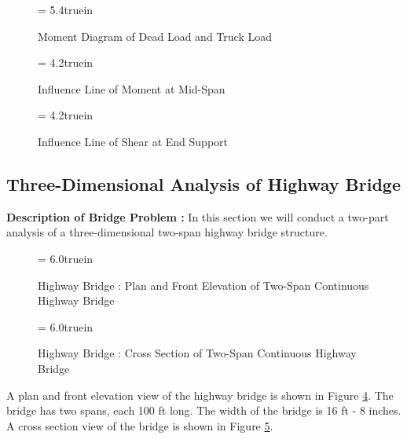 \begin{figure}[h]
\epsfxsize= 5.4truein
\centerline{}
\caption{Moment Diagram of Dead Load and Truck Load}
\label{fig: mom_diag}
\end{figure}

\clearpage
\begin{figure}[th]
\vspace{0.10 in}
\epsfxsize= 4.2truein
\centerline{}
\caption{Influence Line of Moment at Mid-Span}
\label{fig: influ_m}
\end{figure}

\begin{figure}[h]
\vspace{0.30 in}
\epsfxsize= 4.2truein
\centerline{}
\caption{Influence Line of Shear at End Support}
\label{fig: influ_s}
\end{figure}

\clearpage
\subsection{Three-Dimensional Analysis of Highway Bridge}

\vspace{0.15 in}\noindent
{\bf Description of Bridge Problem :}
In this section we will conduct a two-part analysis of a three-dimensional
two-span highway bridge structure.

\begin{figure}[ht]
\epsfxsize= 6.0truein
\centerline{}
\vspace{0.20 in}
\caption{Highway Bridge : Plan and Front Elevation of Two-Span Continuous Highway Bridge}
\label{fig: bridge-plan-and-elevation}
\end{figure}

\begin{figure}[ht]
\epsfxsize= 6.0truein
\centerline{}
\vspace{0.20 in}
\caption{Highway Bridge : Cross Section of Two-Span Continuous Highway Bridge}
\label{fig: bridge-cross-section}
\end{figure}

\vspace{0.15 in}\noindent
A plan and front elevation view of the highway
bridge is shown in Figure \ref{fig: bridge-plan-and-elevation}.
The bridge has two spans, each 100 ft long.
The width of the bridge is 16 ft - 8 inches.
A cross section view of the bridge is shown in
Figure \ref{fig: bridge-cross-section}.

